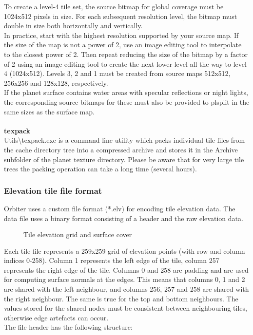 \documentclass[Orbiter Developer Manual.tex]{subfiles}
\begin{document}
To create a level-4 tile set, the source bitmap for global coverage must be 1024x512 pixels in size. For each subsequent resolution level, the bitmap must double in size both horizontally and vertically.\\
In practice, start with the highest resolution supported by your source map. If the size of the map is not a power of 2, use an image editing tool to interpolate to the closest power of 2. Then repeat reducing the size of the bitmap by a factor of 2 using an image editing tool to create the next lower level all the way to level 4 (1024x512). Levels 3, 2 and 1 must be created from source maps 512x512, 256x256 and 128x128, respectively.\\
If the planet surface contains water areas with specular reflections or night lights, the corresponding source bitmaps for these must also be provided to plsplit in the same sizes as the surface map.\\
\\
\textbf{texpack}\\
Utils\textbackslash texpack.exe is a command line utility which packs individual tile files from the cache directory tree into a compressed archive and stores it in the Archive subfolder of the planet texture directory. Please be aware that for very large tile trees the packing operation can take a long time (several hours).


\subsubsection{Elevation tile file format}
\label{sssec:elev_tile_format}
Orbiter uses a custom file format (*.elv) for encoding tile elevation data. The data file uses a binary format consisting of a header and the raw elevation data.

\begin{figure}[H]
	\centering
	\caption{Tile elevation grid and surface cover}
\end{figure}

\noindent
Each tile file represents a 259x259 grid of elevation points (with row and column indices 0-258). Column 1 represents the left edge of the tile, column 257 represents the right edge of the tile. Columns 0 and 258 are padding and are used for computing surface normals at the edges. This means that columns 0, 1 and 2 are shared with the left neighbour, and columns 256, 257 and 258 are shared with the right neighbour. The same is true for the top and bottom neighbours. The values stored for the shared nodes must be consistent between neighbouring tiles, otherwise edge artefacts can occur.\\
The file header has the following structure:
\end{document}
